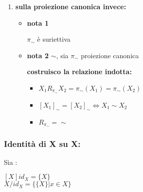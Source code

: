 \documentclass[article,12pt]{book}
\begin{document}
\begin{enumerate}
{\begin{itemize}
\begin{enumerate}
\begin{itemize}
                        \begin{center}
                            $X \sim Y$ \\
                            $Y \sim Z$
                        \end{center}
                \end{itemize} 
\newpage
            \item \textbf{sulla proiezione canonica invece:}
                \begin{itemize}
                    \item \textbf{nota 1}
                        \begin{center}
                            $\pi_\sim$ è  suriettiva
                        \end{center}
                    \item \textbf{nota 2} $\sim$, sia $\pi_\sim$ proiezione canonica
                        \begin{center}
                            \textbf{costruisco la relazione indotta:}\\
                                \begin{itemize}
                                    \item $X_1 R_\pi_\sim X_2 = \pi_\sim (X_1) = \pi_\sim (X_2)$
                                    \item $[X_1]_\sim = [X_2]_\sim \iff X_1 \sim X_2 $
                                    \item $R_\pi_\sim = \sim$
                                \end{itemize}
                        \end{center}
                \end{itemize}
        \end{enumerate}
\end{itemize}
\subsubsection{Identità di X su X:}
Sia :
    \begin{center}
        $[X]id_X = \{X \}$ \\
        $X/id_X = \{\{X\} | x \in X\}$
        
    \end{center}
}
\end{enumerate}
\end{document}
